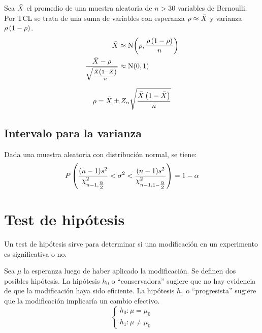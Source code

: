 Sea $\ave{X}$ el promedio de una muestra aleatoria de $n>30$ variables de Bernoulli.
Por TCL se trata de una suma de variables con esperanza $\rho \approx \ave{X}$ y varianza $\rho \inParentheses{1-\rho}$.
\begin{align*}
    \ave{X} & \approx \fx[\nor]{\rho , \frac{\rho \inParentheses{1-\rho}}{n}}
    \\
    \frac{\ave{X}-\rho}{\sqrt{\frac{\ave{X} \inParentheses{1-\ave{X}}}{n}}} & \approx \nor(0,1)
\end{align*}

\begin{mdframed}[style=DefinitionFrame]
    \begin{defn}
    \end{defn}
    \begin{equation*}
        \rho = \ave{X} \pm Z_\alpha \sqrt{\frac{\ave{X} \inParentheses{1-\ave{X}}}{n}}
    \end{equation*}
\end{mdframed}


\subsection{Intervalo para la varianza}

Dada una muestra aleatoria con distribución normal, se tiene:
\begin{equation*}
    P \inParentheses{\frac{(n-1)s^2}{\chi_{n-1,\tfrac{\alpha}{2}}^2} < \sigma^2 < \frac{(n-1)s^2}{\chi_{n-1,1-\tfrac{\alpha}{2}}^2} } = 1 - \alpha
\end{equation*}


\section{Test de hipótesis}

Un test de hipótesis sirve para determinar si una modificación en un experimento es significativa o no.

Sea $\mu$ la esperanza luego de haber aplicado la modificación.
Se definen dos posibles hipótesis.
La hipótesis $h_0$ o ``conservadora'' sugiere que no hay evidencia de que la modificación haya sido eficiente.
La hipótesis $h_1$ o ``progresista'' sugiere que la modificación implicaría un cambio efectivo.
\begin{equation*}
    \left\{
    \begin{aligned}
        h_0: \mu = \mu_0
        \\
        h_1: \mu \neq \mu_0
    \end{aligned}
    \right.
\end{equation*}

